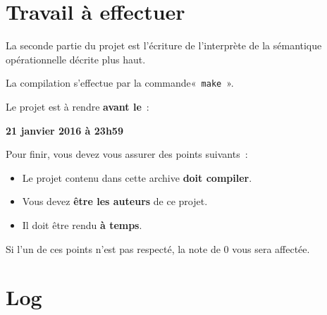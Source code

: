 \documentclass[a4paper,8pt]{article}
\newlength\codewidth
\newenvironment{code}[1][\codewidth]{
\begin{center}
\Sbox
\hspace{0.3cm}\minipage{#1}\small
}{
\endminipage
\endSbox\fbox{\TheSbox}
\end{center}
}
\begin{document}
\section{Travail à effectuer}

La seconde partie du projet est l'écriture de l'interprète de
la sémantique opérationnelle décrite plus haut.

La compilation s'effectue par la commande«~\verb!make!~».

Le projet est à rendre \textbf{avant le}~:

\begin{code}
\begin{center}
\large\textbf{21 janvier 2016 à 23h59}
\end{center}
\end{code}

Pour finir, vous devez vous assurer des points suivants~:
\begin{code}
\begin{itemize}
\item Le projet contenu dans cette archive \textbf{doit compiler}.
\item Vous devez \textbf{être les auteurs} de ce projet.
\item Il doit être rendu \textbf{à temps}.
\end{itemize}
\end{code}

Si l'un de ces points n'est pas respecté, la note de $0$ vous sera affectée.

\section{Log}


\end{document}
